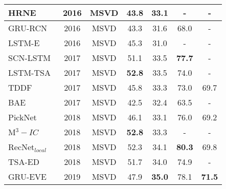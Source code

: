 \documentclass[10pt,journal,compsoc]{IEEEtran}
\begin{document}
\begin{table*}[htbp]
\begin{tabular}{|p{15.43em}|c|c|c|c|c|c|}
    \multicolumn{1}{|l|}{HRNE~\cite{pan2016hierarchical}}  & 2016  & MSVD  & 43.8  & 33.1  & -     & - \\
    \hline
    \multicolumn{1}{|l|}{GRU-RCN~\cite{ballas2015delving}}  & 2016  & MSVD  & 43.3  & 31.6  & 68.0 & - \\
    \hline
    LSTM-E~\cite{pan2016jointly} & 2016  & MSVD  & 45.3  & 31.0  & - & - \\
    \hline
    \multicolumn{1}{|l|}{SCN-LSTM~\cite{gan2017semantic}} & 2017  & MSVD  & 51.1  & 33.5 & \textbf{77.7}  & - \\
    \hline
    \multicolumn{1}{|l|}{LSTM-TSA~\cite{Pan_2017_CVPR}} & 2017  & MSVD  & \textbf{52.8}  & 33.5 & 74.0  & - \\
    \hline
    \multicolumn{1}{|l|}{TDDF~\cite{Zhang_2017_CVPR}} & 2017  & MSVD  & 45.8  & 33.3  & 73.0  & 69.7 \\
    \hline
    \multicolumn{1}{|l|}{BAE~\cite{Baraldi_2017_CVPR}} & 2017  & MSVD  & 42.5  & 32.4 & 63.5  & - \\
    \hline
    \multicolumn{1}{|l|}{PickNet~\cite{chen2018less}} & 2018  & MSVD  & 46.1 & 33.1 & 76.0  & 69.2 \\
    \hline
    \multicolumn{1}{|l|}{M$^3-{IC}$~\cite{wang2018m3}} & 2018  & MSVD  & \textbf{52.8} & 33.3 & -  & - \\
    \hline
    RecNet$_{local}$~\cite{wang2018reconstruction} & 2018  & MSVD & 52.3 & 34.1 & \textbf{80.3} & 69.8 \\
    \hline
    TSA-ED~\cite{wu2018interpretable} & 2018  & MSVD & 51.7 & 34.0 & 74.9 & - \\
    \hline
    GRU-EVE~\cite{gruevehftsem} & 2019 & MSVD & 47.9 & \textbf{35.0} & 78.1 & \textbf{71.5} \\
    \hline

    \end{tabular}%
  \label{tab:msvdresults}%
 \end{table*}%


\vspace{-3mm}
\end{document}

